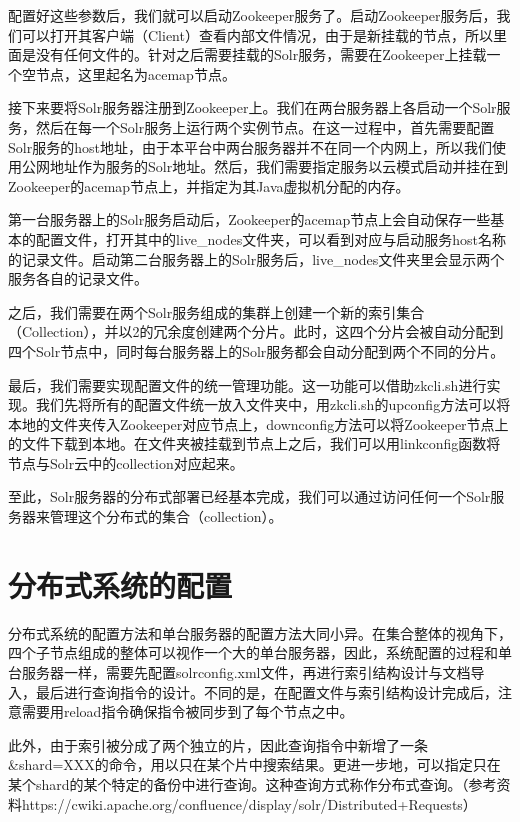 配置好这些参数后，我们就可以启动Zookeeper服务了。启动Zookeeper服务后，我们可以打开其客户端（Client）查看内部文件情况，由于是新挂载的节点，所以里面是没有任何文件的。针对之后需要挂载的Solr服务，需要在Zookeeper上挂载一个空节点，这里起名为acemap节点。

接下来要将Solr服务器注册到Zookeeper上。我们在两台服务器上各启动一个Solr服务，然后在每一个Solr服务上运行两个实例节点。在这一过程中，首先需要配置Solr服务的host地址，由于本平台中两台服务器并不在同一个内网上，所以我们使用公网地址作为服务的Solr地址。然后，我们需要指定服务以云模式启动并挂在到Zookeeper的acemap节点上，并指定为其Java虚拟机分配的内存。

第一台服务器上的Solr服务启动后，Zookeeper的acemap节点上会自动保存一些基本的配置文件，打开其中的live\_nodes文件夹，可以看到对应与启动服务host名称的记录文件。启动第二台服务器上的Solr服务后，live\_nodes文件夹里会显示两个服务各自的记录文件。

之后，我们需要在两个Solr服务组成的集群上创建一个新的索引集合（Collection），并以2的冗余度创建两个分片。此时，这四个分片会被自动分配到四个Solr节点中，同时每台服务器上的Solr服务都会自动分配到两个不同的分片。

最后，我们需要实现配置文件的统一管理功能。这一功能可以借助zkcli.sh进行实现。我们先将所有的配置文件统一放入文件夹中，用zkcli.sh的upconfig方法可以将本地的文件夹传入Zookeeper对应节点上，downconfig方法可以将Zookeeper节点上的文件下载到本地。在文件夹被挂载到节点上之后，我们可以用linkconfig函数将节点与Solr云中的collection对应起来。

至此，Solr服务器的分布式部署已经基本完成，我们可以通过访问任何一个Solr服务器来管理这个分布式的集合（collection）。

\section{分布式系统的配置}
分布式系统的配置方法和单台服务器的配置方法大同小异。在集合整体的视角下，四个子节点组成的整体可以视作一个大的单台服务器，因此，系统配置的过程和单台服务器一样，需要先配置solrconfig.xml文件，再进行索引结构设计与文档导入，最后进行查询指令的设计。不同的是，在配置文件与索引结构设计完成后，注意需要用reload指令确保指令被同步到了每个节点之中。

此外，由于索引被分成了两个独立的片，因此查询指令中新增了一条\&shard=XXX的命令，用以只在某个片中搜索结果。更进一步地，可以指定只在某个shard的某个特定的备份中进行查询。这种查询方式称作分布式查询。（参考资料https://cwiki.apache.org/confluence/display/solr/Distributed+Requests）

